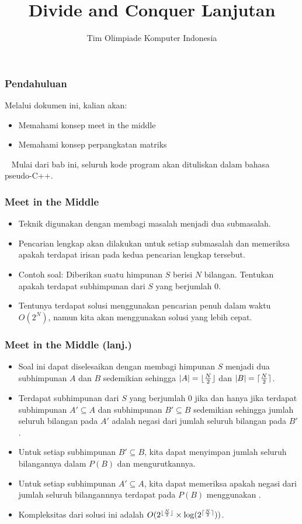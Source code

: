 

\title{Divide and Conquer Lanjutan}
\author{Tim Olimpiade Komputer Indonesia}
\date{}



\begin{frame}
\titlepage
\end{frame}

\begin{frame}
\frametitle{Pendahuluan}
Melalui dokumen ini, kalian akan:
\begin{itemize}
  \item Memahami konsep meet in the middle
  \item Memahami konsep perpangkatan matriks
\end{itemize}
~\newline
Mulai dari bab ini, seluruh kode program akan dituliskan dalam bahasa pseudo-C++.
\end{frame}

\begin{frame}
\frametitle{Meet in the Middle}
\begin{itemize}
  \item Teknik  digunakan dengan membagi masalah menjadi dua submasalah.
  \item Pencarian lengkap akan dilakukan untuk setiap submasalah dan memeriksa apakah terdapat irisan pada kedua pencarian lengkap tersebut.
  \item Contoh soal: Diberikan suatu himpunan $S$ berisi $N$ bilangan. Tentukan apakah terdapat subhimpunan dari $S$ yang berjumlah $0$.
  \item Tentunya terdapat solusi menggunakan pencarian penuh dalam waktu $O(2^N)$, namun kita akan menggunakan solusi yang lebih cepat.
\end{itemize}
\end{frame}

\begin{frame}
\frametitle{Meet in the Middle (lanj.)}
\begin{itemize}
  \item Soal ini dapat diselesaikan dengan membagi himpunan $S$ menjadi dua subhimpunan $A$ dan $B$ sedemikian sehingga $|A| = \lfloor \frac{N}{2} \rfloor$ dan $|B| = \lceil \frac{N}{2} \rceil$.
  \item Terdapat subhimpunan dari $S$ yang berjumlah $0$ jika dan hanya jika terdapat subhimpunan $A' \subseteq A$ dan subhimpunan $B' \subseteq B$ sedemikian sehingga jumlah seluruh bilangan pada $A'$ adalah negasi dari jumlah seluruh bilangan pada $B'$.
  \item Untuk setiap subhimpunan $B' \subseteq B$, kita dapat menyimpan jumlah seluruh bilangannya dalam \farray $P(B)$ dan mengurutkannya.
  \item Untuk setiap subhimpunan $A' \subseteq A$, kita dapat memeriksa apakah negasi dari jumlah seluruh bilangannnya terdapat pada \farray$P(B)$ menggunakan \fbinarySearch.
  \item Kompleksitas dari solusi ini adalah $O(2^{\lfloor \frac{N}{2} \rfloor} \times \log(2^{\lceil \frac{N}{2} \rceil}))$.
\end{itemize}
\end{frame}

